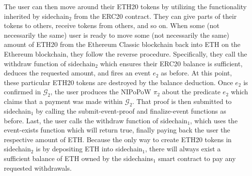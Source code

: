 The user can then move around their ETH20 tokens by utilizing the functionality
inherited by \textsf{sidechain}$_2$ from the \textsf{ERC20} contract. They can
give parts of their tokens to others, receive tokens from others, and so on.
When some (not necessarily the same) user is ready to move some (not necessarily
the same) amount of ETH20 from the Ethereum Classic blockchain back into ETH
on the Ethereum blockchain, they follow the reverse procedure. Specifically,
they call the \textsf{withdraw} function of \textsf{sidechain}$_2$ which ensures
their ERC20 balance is sufficient, deduces the requested amount, and fires an
event $e_2$ as before. At this point, these particular ETH20 tokens are
destroyed by the balance deduction. Once $e_2$ is confirmed in $\mathcal{G}_2$,
the user produces the NIPoPoW $\pi_2$ about the predicate $e_2$ which claims
that a payment was made within $\mathcal{G}_2$. That proof is then submitted to
\textsf{sidechain}$_1$ by calling the \textsf{submit-event-proof} and
\textsf{finalize-event} functions as before. Last, the user calls the
\textsf{withdraw} function of \textsf{sidechain}$_1$, which uses the
\textsf{event-exists} function which will return \textsf{true}, finally paying
back the user the respective amount of ETH. Because the only way to create ETH20
tokens in \textsf{sidechain}$_2$ is by depositing ETH into
\textsf{sidechain}$_1$, there will always exist a sufficient balance of ETH
owned by the \textsf{sidechains}$_1$ smart contract to pay any requested
withdrawals.
